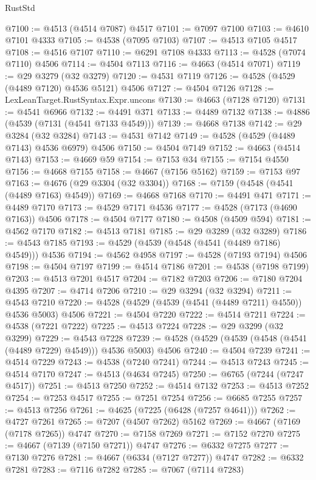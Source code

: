 \begin{lexlean}{RustStd}
\begin{coremodule}
@7100 := @4513 (@4514 @7087) @4517
@7101 := @7097 @7100
@7103 := @4610 @7101 @4333
@7105 := @4538 (@7095 @7103)
@7107 := @4513 @7105 @4517
@7108 := @4516 @7107
@7110 := @6291 @7108 @4333
@7113 := @4528 (@7074 @7110) @4506
@7114 := @4504 @7113
@7116 := @4663 (@4514 @7071)
@7119 := @29 @3279 (@32 @3279)
@7120 := @4531 @7119
@7126 := @4528 (@4529 (@4489 @7120) @4536 @5121) @4506
@7127 := @4504 @7126
@7128 := LexLeanTarget.RustSyntax.Expr.uncons
@7130 := @4663 (@7128 @7120)
@7131 := @4541 @6966
@7132 := @4491 @371
@7133 := @4489 @7132
@7138 := @4886 (@4539 (@7131 (@4541 @7133 @4549)))
@7139 := @4668 @7138
@7142 := @29 @3284 (@32 @3284)
@7143 := @4531 @7142
@7149 := @4528 (@4529 (@4489 @7143) @4536 @6979) @4506
@7150 := @4504 @7149
@7152 := @4663 (@4514 @7143)
@7153 := @4669 @59
@7154 := @7153 @34
@7155 := @7154 @4550
@7156 := @4668 @7155
@7158 := @4667 (@7156 @5162)
@7159 := @7153 @97
@7163 := @4676 (@29 @3304 (@32 @3304))
@7168 := @7159 (@4548 (@4541 (@4489 @7163) @4549))
@7169 := @4668 @7168
@7170 := @4491 @471
@7171 := @4489 @7170
@7173 := @4529 @7171 @4536
@7177 := @4528 (@7173 (@4690 @7163)) @4506
@7178 := @4504 @7177
@7180 := @4508 (@4509 @594)
@7181 := @4562 @7170
@7182 := @4513 @7181
@7185 := @29 @3289 (@32 @3289)
@7186 := @4543 @7185
@7193 := @4529 (@4539 (@4548 (@4541 (@4489 @7186) @4549))) @4536
@7194 := @4562 @4958
@7197 := @4528 (@7193 @7194) @4506
@7198 := @4504 @7197
@7199 := @4514 @7186
@7201 := @4538 (@7198 @7199)
@7203 := @4513 @7201 @4517
@7204 := @7182 @7203
@7206 := @7180 @7204 @4395
@7207 := @4714 @7206
@7210 := @29 @3294 (@32 @3294)
@7211 := @4543 @7210
@7220 := @4528 (@4529 (@4539 (@4541 (@4489 @7211) @4550)) @4536 @5003) @4506
@7221 := @4504 @7220
@7222 := @4514 @7211
@7224 := @4538 (@7221 @7222)
@7225 := @4513 @7224
@7228 := @29 @3299 (@32 @3299)
@7229 := @4543 @7228
@7239 := @4528 (@4529 (@4539 (@4548 (@4541 (@4489 @7229) @4549))) @4536 @5003) @4506
@7240 := @4504 @7239
@7241 := @4514 @7229
@7243 := @4538 (@7240 @7241)
@7244 := @4513 @7243
@7245 := @4514 @7170
@7247 := @4513 (@4634 @7245)
@7250 := @6765 (@7244 (@7247 @4517))
@7251 := @4513 @7250
@7252 := @4514 @7132
@7253 := @4513 @7252
@7254 := @7253 @4517
@7255 := @7251 @7254
@7256 := @6685 @7255
@7257 := @4513 @7256
@7261 := @4625 (@7225 (@6428 (@7257 @4641)))
@7262 := @4727 @7261
@7265 := @7207 (@4507 @7262) @5162
@7269 := @4667 (@7169 (@7178 @7265)) @4747
@7270 := @7158 @7269
@7271 := @7152 @7270
@7275 := @4667 (@7139 (@7150 @7271)) @4747
@7276 := @6332 @7275
@7277 := @7130 @7276
@7281 := @4667 (@6334 (@7127 @7277)) @4747
@7282 := @6332 @7281
@7283 := @7116 @7282
@7285 := @7067 (@7114 @7283)

\end{coremodule}
\end{lexlean}
